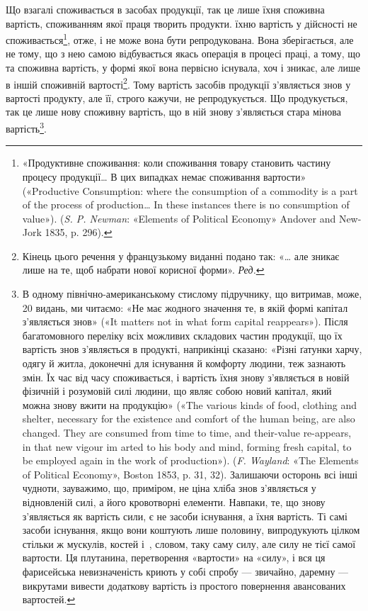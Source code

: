Що взагалі споживається в засобах продукції, так це лише
їхня споживна вартість, споживанням якої праця творить продукти.
їхню вартість у дійсності не споживається\footnote{
«Продуктивне споживання: коли споживання товару становить
частину процесу продукції\dots{} В цих випадках немає споживання вартости»
(«Productive Consumption: where the consumption of a commodity is a
part of the process of production\dots{} In these instances there is no consumption
of value»). (\emph{S. P. Newman}: «Elements of Political Economy» Andover
and New-Jork 1835, p. 296).
}, отже, і
не може вона бути репродукована. Вона зберігається, але не
тому, що з нею самою відбувається якась операція в процесі
праці, а тому, що та споживна вартість, у формі якої вона первісно
існувала, хоч і зникає, але лише в іншій споживній вартості\footnote*{
Кінець цього речення у французькому виданні подано так: «\dots{} але
зникає лише на те, щоб набрати нової корисної форми». \emph{Ред.}
}.
Тому вартість засобів продукції з’являється знов у вартості
продукту, але її, строго кажучи, не репродукується. Що продукується,
так це лише нову споживну вартість, що в ній знову
з’являється стара мінова вартість\footnote{
В одному північно-американському стислому підручнику, що витримав,
може, 20 видань, ми читаємо: «Не має жодного значення те, в
якій формі капітал з’являється знов» («It matters not in what form capital
reappears»). Після багатомовного переліку всіх можливих складових
частин продукції, що їх вартість знов з’являється в продукті, наприкінці
сказано: «Різні ґатунки харчу, одягу й житла, доконечні для існування
й комфорту людини, теж зазнають змін. Їх час від часу споживається, і
вартість їхня знову з’являється в новій фізичній і розумовій силі людини, що
являє собою новий капітал, який можна знову вжити на продукцію» («The
various kinds of food, clothing and shelter, necessary for the existence and
comfort of the human being, are also changed. They are consumed from time
to time, and their-value re-appears, in that new vigour im arted to his
body and mind, forming fresh capital, to be employed again in the work
of production»). (\emph{F. Wayland}: «The Elements of Political Economy»,
Boston 1853, p. 31, 32). Залишаючи осторонь всі інші чудноти, зауважимо,
що, приміром, не ціна хліба знов з’являється у відновленій силі,
а його кровотворні елементи. Навпаки, те, що знову з’являється як вартість
сили, є не засоби існування, а їхня вартість. Ті самі засоби існування,
якщо вони коштують лише половину, випродукують цілком стільки ж
мускулів, костей і~, словом, таку саму силу, але силу не тієї самої
вартости. Ця плутанина, перетворення «вартости» на «силу», і вся ця
фарисейська невизначеність криють у собі спробу — звичайно, даремну —
викрутами вивести додаткову вартість із простого повернення авансованих
вартостей.
}.

